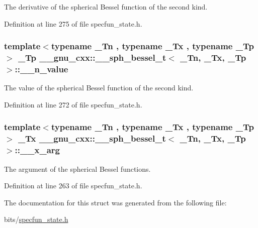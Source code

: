 The derivative of the spherical Bessel function of the second kind. 



Definition at line 275 of file specfun\+\_\+state.\+h.

\subsubsection[{\texorpdfstring{\+\_\+\+\_\+n\+\_\+value}{__n_value}}]{\setlength{\rightskip}{0pt plus 5cm}template$<$typename \+\_\+\+Tn , typename \+\_\+\+Tx , typename \+\_\+\+Tp $>$ \+\_\+\+Tp {\bf \+\_\+\+\_\+gnu\+\_\+cxx\+::\+\_\+\+\_\+sph\+\_\+bessel\+\_\+t}$<$ \+\_\+\+Tn, \+\_\+\+Tx, \+\_\+\+Tp $>$\+::\+\_\+\+\_\+n\+\_\+value}\hypertarget{struct____gnu__cxx_1_1____sph__bessel__t_ad846c3cb00bfabcbddc3e2f6512e3d7f}{}\label{struct____gnu__cxx_1_1____sph__bessel__t_ad846c3cb00bfabcbddc3e2f6512e3d7f}


The value of the spherical Bessel function of the second kind. 



Definition at line 272 of file specfun\+\_\+state.\+h.

\subsubsection[{\texorpdfstring{\+\_\+\+\_\+x\+\_\+arg}{__x_arg}}]{\setlength{\rightskip}{0pt plus 5cm}template$<$typename \+\_\+\+Tn , typename \+\_\+\+Tx , typename \+\_\+\+Tp $>$ \+\_\+\+Tx {\bf \+\_\+\+\_\+gnu\+\_\+cxx\+::\+\_\+\+\_\+sph\+\_\+bessel\+\_\+t}$<$ \+\_\+\+Tn, \+\_\+\+Tx, \+\_\+\+Tp $>$\+::\+\_\+\+\_\+x\+\_\+arg}\hypertarget{struct____gnu__cxx_1_1____sph__bessel__t_afa9cf4b1888081bd21716c58ed19719b}{}\label{struct____gnu__cxx_1_1____sph__bessel__t_afa9cf4b1888081bd21716c58ed19719b}


The argument of the spherical Bessel functions. 



Definition at line 263 of file specfun\+\_\+state.\+h.



The documentation for this struct was generated from the following file\+:\begin{DoxyCompactItemize}
\item 
bits/\hyperlink{specfun__state_8h}{specfun\+\_\+state.\+h}\end{DoxyCompactItemize}
